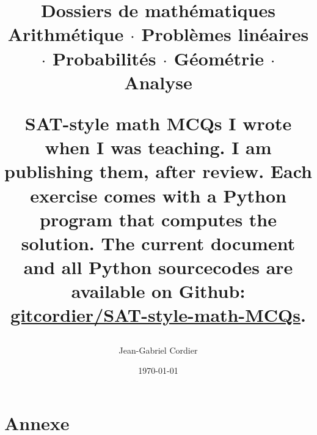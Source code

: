 \documentclass[a4paper,10pt,titlepage,openany,leqno]{book}
\theoremstyle{definition}
\theoremstyle{remark}
\def\ROOT{./}
\def\TITLE{\textbf{Dossiers de mathématiques}\\[0.5em]%
\large Arithmétique $\cdot$ Problèmes linéaires $\cdot$ %
Probabilités $\cdot$ Géométrie $\cdot$ Analyse\\
\vspace{1cm}
{\raggedright SAT-style math MCQs I wrote when I was teaching. 
I am publishing them, after review. 
Each exercise comes with a Python program that computes the solution. 
The current document and all Python sourcecodes are available on Github: 
\href{https://github.com/gitcordier/SAT-style-math-MCQs}{gitcordier/SAT-style-math-MCQs}.\par
}
}
\def\AUTHOR{Jean-Gabriel Cordier}
\begin{document}
\title{\TITLE}
\author{\AUTHOR}
\date{\today}
\maketitle


\renewcommand{\labelenumi}{\Alph{enumi})}

\renewcommand{\chaptername}{Chapitre}
%
\let\oldproofname=\proofname
\renewcommand{\proofname}{{\rm \small RÉPONSE}}
%
\frontmatter
\tableofcontents
\renewcommand{\thesection}{\Roman{section}}
\renewcommand{\thesubsection}{\roman{subsection}} 
\renewcommand{\thesection}{Exercice \arabic{section}} 

\mainmatter
 

\backmatter
\chapter{Annexe}


\setcounter{annex_chapter}{1}
\setcounter{annex_section}{1}
\setcounter{equation}{0}

\renewcommand{\thechapter}{\Alph{annex_chapter}} 
\renewcommand{\thesection}{\thechapter.\arabic{annex_section}} 
\renewcommand{\theequation}{\thechapter.\arabic{equation}}
%

\end{document}
